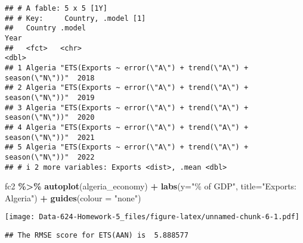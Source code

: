 \documentclass[
]{article}
\newenvironment{Shaded}{\begin{snugshade}}{\end{snugshade}}
\newcommand{\AttributeTok}[1]{\textcolor[rgb]{0.13,0.29,0.53}{#1}}
\newcommand{\DecValTok}[1]{\textcolor[rgb]{0.00,0.00,0.81}{#1}}
\newcommand{\FunctionTok}[1]{\textcolor[rgb]{0.13,0.29,0.53}{\textbf{#1}}}
\newcommand{\NormalTok}[1]{#1}
\newcommand{\OtherTok}[1]{\textcolor[rgb]{0.56,0.35,0.01}{#1}}
\newcommand{\SpecialCharTok}[1]{\textcolor[rgb]{0.81,0.36,0.00}{\textbf{#1}}}
\newcommand{\StringTok}[1]{\textcolor[rgb]{0.31,0.60,0.02}{#1}}
\begin{document}
\begin{verbatim}
## # A fable: 5 x 5 [1Y]
## # Key:     Country, .model [1]
##   Country .model                                                        Year
##   <fct>   <chr>                                                        <dbl>
## 1 Algeria "ETS(Exports ~ error(\"A\") + trend(\"A\") + season(\"N\"))"  2018
## 2 Algeria "ETS(Exports ~ error(\"A\") + trend(\"A\") + season(\"N\"))"  2019
## 3 Algeria "ETS(Exports ~ error(\"A\") + trend(\"A\") + season(\"N\"))"  2020
## 4 Algeria "ETS(Exports ~ error(\"A\") + trend(\"A\") + season(\"N\"))"  2021
## 5 Algeria "ETS(Exports ~ error(\"A\") + trend(\"A\") + season(\"N\"))"  2022
## # i 2 more variables: Exports <dist>, .mean <dbl>
\end{verbatim}

\begin{Shaded}
\begin{Highlighting}[]
\NormalTok{fc2 }\SpecialCharTok{\%\textgreater{}\%} \FunctionTok{autoplot}\NormalTok{(algeria\_economy) }\SpecialCharTok{+}
  \FunctionTok{labs}\NormalTok{(}\AttributeTok{y=}\StringTok{"\% of GDP"}\NormalTok{, }\AttributeTok{title=}\StringTok{"Exports: Algeria"}\NormalTok{) }\SpecialCharTok{+} \FunctionTok{guides}\NormalTok{(}\AttributeTok{colour =} \StringTok{"none"}\NormalTok{)}
\end{Highlighting}
\end{Shaded}

\texttt{[image: Data-624-Homework-5\_files/figure-latex/unnamed-chunk-6-1.pdf]}

\begin{Shaded}
\end{Shaded}

\begin{verbatim}
## The RMSE score for ETS(AAN) is  5.888577
\end{verbatim}

\begin{Shaded}
\end{Shaded}
\end{document}
